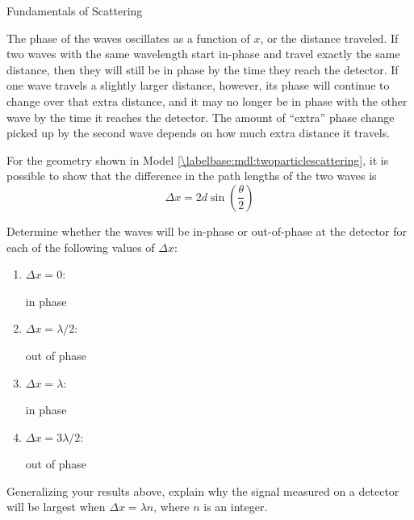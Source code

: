 \begin{activity}{Fundamentals of Scattering}
\begin{ctqs}
		\begin{solution}[2in]{}
			The phase of the waves oscillates as a function of $x$, or the distance traveled.  If two waves with the same wavelength start in-phase and travel exactly the same distance, then they will still be in phase by the time they reach the detector.  If one wave travels a slightly larger distance, however, its phase will continue to change over that extra distance, and it may no longer be in phase with the other wave by the time it reaches the detector.  The amount of ``extra'' phase change picked up by the second wave depends on how much extra distance it travels.
		\end{solution}
	
	\question For the geometry shown in Model \ref{\labelbase:mdl:twoparticlescattering}, it is possible to show %
		that the difference in the path lengths of the two waves is \label{\labelbase:ctq:deltax}
		\begin{equation*}
			\Delta x = 2 d \sin\left(\frac{\theta}{2}\right)
		\end{equation*}
		
		Determine whether the waves will be in-phase or out-of-phase at the detector for each of the following values of $\Delta x$:
		
		\begin{enumerate}
			\item $\Delta x = 0$:
				\begin{solution}[0.25in]{}
					in phase
				\end{solution}
			\item $\Delta x = \lambda/2$:
				\begin{solution}[0.25in]{}
					out of phase
				\end{solution}
			\item $\Delta x = \lambda$:
				\begin{solution}[0.25in]{}
					in phase
				\end{solution}
			\item $\Delta x = 3\lambda/2$:
				\begin{solution}[0.25in]{}
					out of phase
				\end{solution}
		\end{enumerate}
		
	\question Generalizing your results above, explain why the signal measured on a detector will be largest when $\Delta x = \lambda n$, where $n$ is an integer.
	

\end{ctqs}
\end{activity}
